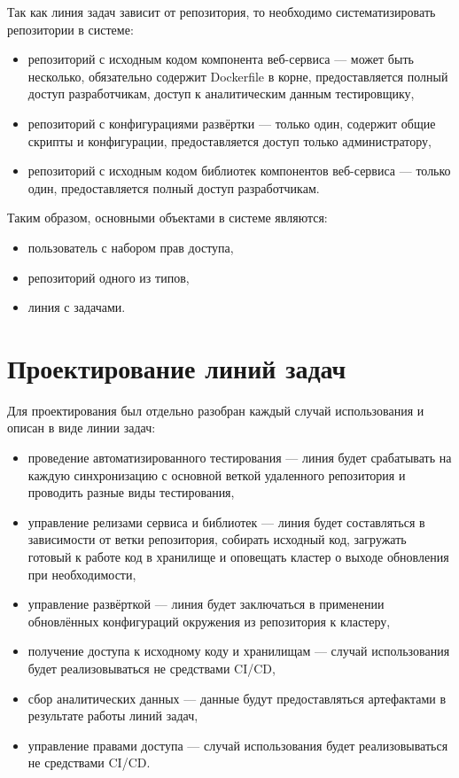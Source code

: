 Так как линия задач зависит от репозитория, то необходимо систематизировать репозитории в системе:

\begin{itemize}
    \item репозиторий с исходным кодом компонента веб-сервиса --- может быть несколько, обязательно содержит Dockerfile в корне,
        предоставляется полный доступ разработчикам, доступ к аналитическим данным тестировщику,
    \item репозиторий с конфигурациями развёртки --- только один, содержит общие скрипты и конфигурации, предоставляется доступ только администратору,
    \item репозиторий с исходным кодом библиотек компонентов веб-сервиса --- только один, предоставляется полный доступ разработчикам.
\end{itemize}

Таким образом, основными объектами в системе являются:
\begin{itemize}
    \item пользователь с набором прав доступа,
    \item репозиторий одного из типов,
    \item линия с задачами.
\end{itemize}

\section{Проектирование линий задач}

Для проектирования был отдельно разобран каждый случай использования и описан в виде линии задач:
\begin{itemize}
    \item проведение автоматизированного тестирования --- линия будет срабатывать на каждую синхронизацию с основной веткой удаленного репозитория и проводить разные виды тестирования,
    \item управление релизами сервиса и библиотек --- линия будет составляться в зависимости от ветки репозитория, собирать исходный код, загружать готовый к работе код в хранилище и
    оповещать кластер о выходе обновления при необходимости,

    \item управление развёрткой --- линия будет заключаться в применении обновлённых конфигураций окружения из репозитория к кластеру,
    \item получение доступа к исходному коду и хранилищам --- случай использования будет реализовываться не средствами CI/CD,
    \item сбор аналитических данных --- данные будут предоставляться артефактами в результате работы линий задач,
    \item управление правами доступа --- случай использования будет реализовываться не средствами CI/CD.
\end{itemize}

